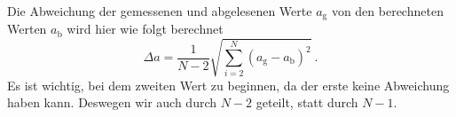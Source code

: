 Die Abweichung der gemessenen und abgelesenen Werte $a_\text{g}$ von den berechneten Werten $a_\text{b}$ wird hier wie folgt berechnet
\begin{equation}
\Delta a = \frac{1}{N-2} \sqrt{ \sum_{i=2}^{N} (a_\text{g} - a_\text{b})^2 } \ .
\end{equation}
Es ist wichtig, bei dem zweiten Wert zu beginnen, da der erste keine Abweichung haben kann. Deswegen wir auch durch $N-2$ geteilt, statt durch $N-1$.